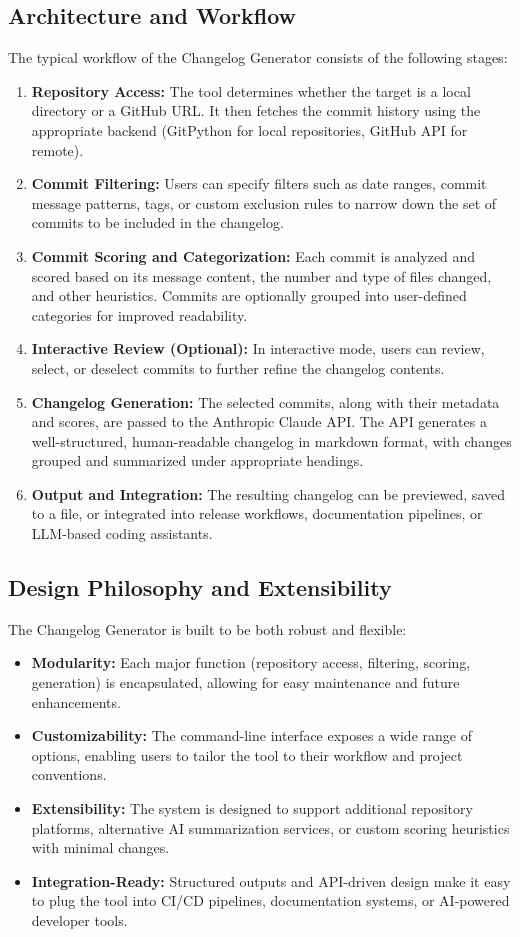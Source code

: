 \documentclass[sigconf]{acmart}
\begin{document}
\subsection{Architecture and Workflow}
The typical workflow of the Changelog Generator consists of the following stages:
\begin{enumerate}
    \item \textbf{Repository Access:} The tool determines whether the target is a local directory or a GitHub URL. It then fetches the commit history using the appropriate backend (GitPython for local repositories, GitHub API for remote).
    \item \textbf{Commit Filtering:} Users can specify filters such as date ranges, commit message patterns, tags, or custom exclusion rules to narrow down the set of commits to be included in the changelog.
    \item \textbf{Commit Scoring and Categorization:} Each commit is analyzed and scored based on its message content, the number and type of files changed, and other heuristics. Commits are optionally grouped into user-defined categories for improved readability.
    \item \textbf{Interactive Review (Optional):} In interactive mode, users can review, select, or deselect commits to further refine the changelog contents.
    \item \textbf{Changelog Generation:} The selected commits, along with their metadata and scores, are passed to the Anthropic Claude API. The API generates a well-structured, human-readable changelog in markdown format, with changes grouped and summarized under appropriate headings.
    \item \textbf{Output and Integration:} The resulting changelog can be previewed, saved to a file, or integrated into release workflows, documentation pipelines, or LLM-based coding assistants.
\end{enumerate}

\subsection{Design Philosophy and Extensibility}
The Changelog Generator is built to be both robust and flexible:
\begin{itemize}
    \item \textbf{Modularity:} Each major function (repository access, filtering, scoring, generation) is encapsulated, allowing for easy maintenance and future enhancements.
    \item \textbf{Customizability:} The command-line interface exposes a wide range of options, enabling users to tailor the tool to their workflow and project conventions.
    \item \textbf{Extensibility:} The system is designed to support additional repository platforms, alternative AI summarization services, or custom scoring heuristics with minimal changes.
    \item \textbf{Integration-Ready:} Structured outputs and API-driven design make it easy to plug the tool into CI/CD pipelines, documentation systems, or AI-powered developer tools.
\end{itemize}
\end{document}
